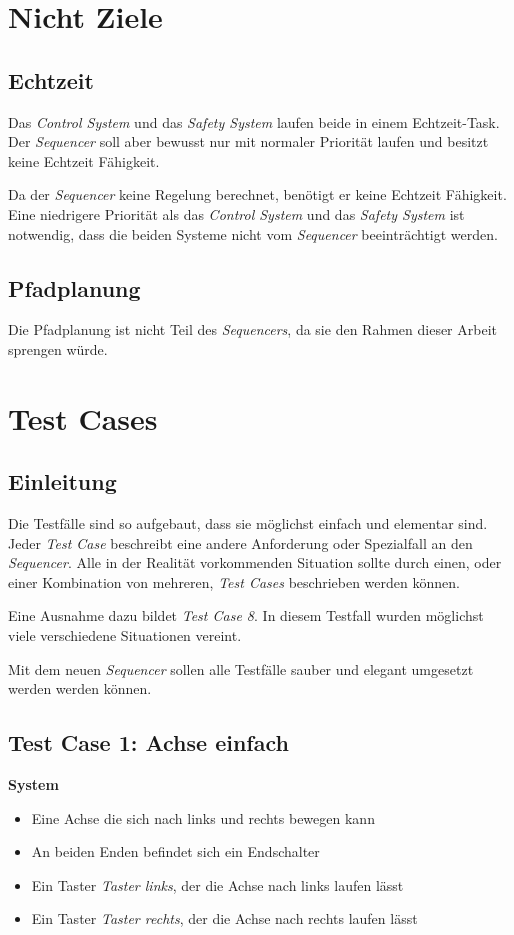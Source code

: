 \section{Nicht Ziele}
\subsection{Echtzeit}
Das \textit{Control System} und das \textit{Safety System} laufen beide in einem Echtzeit-Task.
Der \textit{Sequencer} soll aber bewusst nur mit normaler Priorität laufen und besitzt keine Echtzeit Fähigkeit.

Da der \textit{Sequencer} keine Regelung berechnet, benötigt er keine Echtzeit Fähigkeit.
Eine niedrigere Priorität als das \textit{Control System} und das \textit{Safety System} ist notwendig, dass die beiden Systeme nicht vom \textit{Sequencer} beeinträchtigt werden.


\subsection{Pfadplanung}
Die Pfadplanung ist nicht Teil des \textit{Sequencers}, da sie den Rahmen dieser Arbeit sprengen würde.



\section{Test Cases}
\subsection{Einleitung}
Die Testfälle sind so aufgebaut, dass sie möglichst einfach und elementar sind.
Jeder \textit{Test Case} beschreibt eine andere Anforderung oder Spezialfall an den \textit{Sequencer}.
Alle in der Realität vorkommenden Situation sollte durch einen, oder einer Kombination von mehreren, \textit{Test Cases} beschrieben werden können.

Eine Ausnahme dazu bildet \textit{Test Case 8}.
In diesem Testfall wurden möglichst viele verschiedene Situationen vereint.

Mit dem neuen \textit{Sequencer} sollen alle Testfälle sauber und elegant umgesetzt werden werden können.


\subsection{Test Case 1: Achse einfach}
\textbf{System}
\begin{itemize}
\item Eine Achse die sich nach links und rechts bewegen kann
\item An beiden Enden befindet sich ein Endschalter
\item Ein Taster \textit{Taster links}, der die Achse nach links laufen lässt
\item Ein Taster \textit{Taster rechts}, der die Achse nach rechts laufen lässt
\end{itemize}

